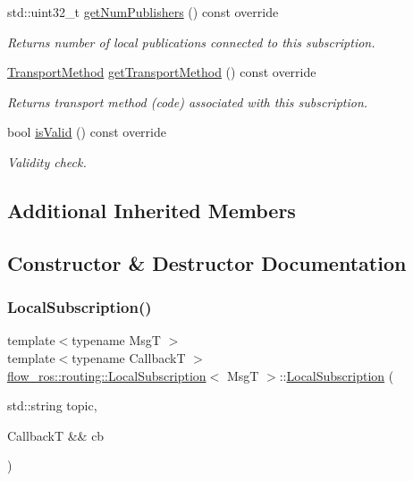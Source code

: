 \begin{DoxyCompactItemize}
std\+::uint32\+\_\+t \hyperlink{classflow__ros_1_1routing_1_1_local_subscription_a748216bf715060b2435f8e051d547c84}{get\+Num\+Publishers} () const override
\begin{DoxyCompactList}\small\item\em Returns number of local publications connected to this subscription. \end{DoxyCompactList}\item 
\hyperlink{transport__info_8h_ae57afcf849a5bdb82b958347c6ccc57b}{Transport\+Method} \hyperlink{classflow__ros_1_1routing_1_1_local_subscription_a60bf03541b2e5dd1a0af5c80f957f1c1}{get\+Transport\+Method} () const override
\begin{DoxyCompactList}\small\item\em Returns transport method (code) associated with this subscription. \end{DoxyCompactList}\item 
bool \hyperlink{classflow__ros_1_1routing_1_1_local_subscription_ac6fd67afc41be35f69ede7ca5fd8dcfa}{is\+Valid} () const override
\begin{DoxyCompactList}\small\item\em Validity check. \end{DoxyCompactList}\end{DoxyCompactItemize}
\subsection*{Additional Inherited Members}


\subsection{Constructor \& Destructor Documentation}
\mbox{\label{classflow__ros_1_1routing_1_1_local_subscription_a1237291e8d1b96fc53dfbdd8f03c7b41}} 
\subsubsection{\texorpdfstring{Local\+Subscription()}{LocalSubscription()}}
{\footnotesize\ttfamily template$<$typename MsgT $>$ \\
template$<$typename CallbackT $>$ \\
\hyperlink{classflow__ros_1_1routing_1_1_local_subscription}{flow\+\_\+ros\+::routing\+::\+Local\+Subscription}$<$ MsgT $>$\+::\hyperlink{classflow__ros_1_1routing_1_1_local_subscription}{Local\+Subscription} (\begin{DoxyParamCaption}\item[{std\+::string}]{topic,  }\item[{CallbackT \&\&}]{cb }\end{DoxyParamCaption})\hspace{0.3cm}{\ttfamily [inline]}}



